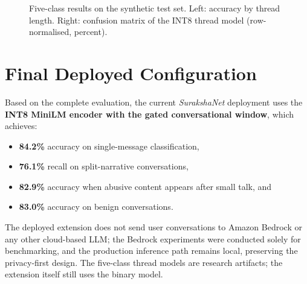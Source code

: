 \documentclass[sigconf,9pt]{acmart}
\begin{document}
\begin{figure}[!t]
  \centering
  \begin{minipage}[c]{0.56\textwidth}\centering
    \resizebox{\linewidth}{!}{}
  \end{minipage}\hfill
  \begin{minipage}[c]{0.42\textwidth}\centering
    \resizebox{0.9\linewidth}{!}{}
  \end{minipage}
  \caption{Five-class results on the synthetic test set. Left: accuracy by thread length. Right: confusion matrix of the INT8 thread model (row-normalised, percent).}
  \label{fig:results2}
\end{figure}

\section{Final Deployed Configuration}
Based on the complete evaluation, the current \textit{SurakshaNet} deployment uses the \textbf{INT8 MiniLM encoder with the gated conversational window}, which achieves:
\begin{itemize}
    \item \textbf{84.2\%} accuracy on single-message classification,
    \item \textbf{76.1\%} recall on split-narrative conversations,
    \item \textbf{82.9\%} accuracy when abusive content appears after small talk, and
    \item \textbf{83.0\%} accuracy on benign conversations.
\end{itemize}
The deployed extension does not send user conversations to Amazon Bedrock or any other cloud-based LLM; the Bedrock experiments were conducted solely for benchmarking, and the production inference path remains local, preserving the privacy-first design. The five-class thread models are research artifacts; the extension itself still uses the binary model.
\end{document}
